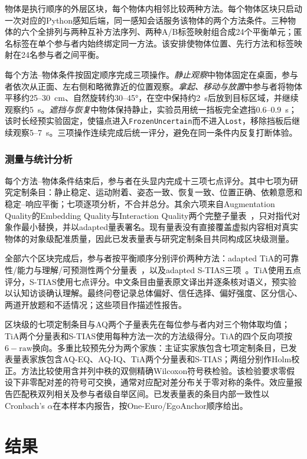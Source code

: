 \documentclass[review]{vgtc}
\begin{document}
物体是执行顺序的外层区块，每个物体内相邻比较两种方法。每个物体区块只启动一次对应的Python感知后端，同一感知会话服务该物体的两个方法条件。三种物体的六个全排列与两种互补方法序列、两种A/B标签映射组合成24个平衡单元；匿名标签在单个参与者内始终绑定同一方法。该安排使物体位置、先行方法和标签映射在24名参与者之间平衡。

每个方法--物体条件按固定顺序完成三项操作。\emph{静止观察}中物体固定在桌面，参与者依次从正面、左右侧和略微靠近的位置观察。\emph{拿起、移动与放置}中参与者将物体平移约25--30~cm、自然旋转约30--45°，在空中保持约2~s后放到目标区域，并继续观察约5~s。\emph{遮挡与恢复}中物体保持静止，实验员用统一挡板完全遮挡0.6--0.9~s；该时长经预实验固定，使锚点进入\texttt{FrozenUncertain}而不进入\texttt{Lost}，移除挡板后继续观察5--7~s。三项操作连续完成后统一评分，避免在同一条件内反复打断体验。

\subsubsection{测量与统计分析}

每个方法--物体条件结束后，参与者在头显内完成十三项七点评分。其中七项为研究定制条目：静止稳定、运动附着、姿态一致、恢复一致、位置正确、依赖意愿和稳定--响应平衡；七项逐项分析，不合并总分。其余六项来自Augmentation Quality的Embedding Quality与Interaction Quality两个完整子量表~\cite{schein2025aq}，只对指代对象作最小替换，并以adapted量表署名。现有量表没有直接覆盖虚拟内容相对真实物体的对象级配准质量，因此已发表量表与研究定制条目共同构成区块级测量。

全部六个区块完成后，参与者按平衡顺序分别评价两种方法：adapted TiA的可靠性/能力与理解/可预测性两个分量表~\cite{koerber2019tia}，以及adapted S-TIAS三项~\cite{mcgrath2025stias}。TiA使用五点评分，S-TIAS使用七点评分。中文条目由量表原文译出并逐条核对语义，预实验以认知访谈确认理解。最终问卷记录总体偏好、信任选择、偏好强度、区分信心、两道开放题和不适情况；这些项目作描述性报告。

区块级的七项定制条目与AQ两个子量表先在每位参与者内对三个物体取均值；TiA两个分量表和S-TIAS使用每种方法一次的方法级得分。TiA的四个反向项按$6-\mathrm{raw}$换向。多重比较预先分为两个家族：主证实家族包含七项定制条目，已发表量表家族包含AQ-EQ、AQ-IQ、TiA两个分量表和S-TIAS；两组分别作Holm校正。方法比较使用含并列中秩的双侧精确Wilcoxon符号秩检验。该检验要求零假设下非零配对差的符号可交换，通常对应配对差分布关于零对称的条件。效应量报告匹配秩双列相关及参与者级自举区间。已发表量表的条目内部一致性以Cronbach's $\alpha$在本样本内报告，按One-Euro/EgoAnchor顺序给出。

\section{结果}\label{sec:results}
\end{document}
